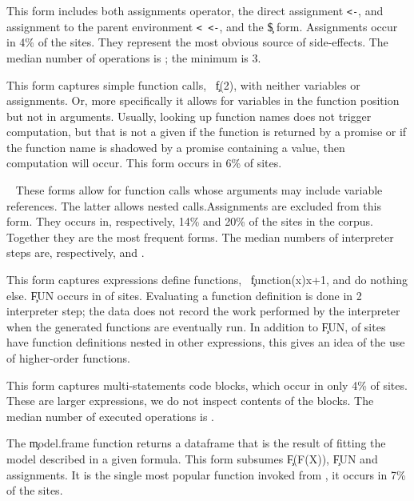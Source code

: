 \documentclass[screen,acmsmall]{acmart}
\begin{document}
\medskip\noindent{} This form includes both assignments
operator, the direct assignment {\tt <-}, and assignment to the parent
environment {\tt <\,\!<-}, and the \c{\$} form. Assignments occur in 4\% of the
sites. They represent the most obvious source of side-effects. The median number
of operations is \packageMinimizedmedianoperationsiRnd; the minimum is 3.

\medskip\noindent{} This form captures simple function calls,
\eg~\c{f(2)}, with neither variables or assignments. Or, more specifically it
allows for variables in the function position but not in arguments. Usually,
looking up function names does not trigger computation, but that is not a given
if the function is returned by a promise or if the function name is shadowed by
a promise containing a value, then computation will occur. This form occurs in
6\% of sites.

\medskip\noindent{}~ These
forms allow for function calls whose arguments may include variable references.
The latter allows nested calls.Assignments are excluded from this form. They
occurs in, respectively, 14\% and 20\% of the sites in the corpus. Together they
are the most frequent forms. The median numbers of interpreter steps are,
respectively, \packageMinimizedmedianoperationsdRnd and
\packageMinimizedmedianoperationsbRnd.

\medskip\noindent{} This form captures expressions define
functions, \eg~\c{function(x)x+1}, and do nothing else. \c{FUN} occurs in
\packageFunctionDefinitionSitesPercent of sites. Evaluating a function
definition is done in 2 interpreter step; the data does not record the work
performed by the interpreter when the generated functions are eventually run. In
addition to \c{FUN}, \packageGeneralizedFunctionDefinitionSitesPercent of sites
have function definitions nested in other expressions, this gives an idea of the
use of higher-order functions.

\medskip\noindent{} This form captures multi-statements
code blocks, which occur in only 4\% of sites. These are larger expressions, we
do not inspect contents of the blocks. The median number of executed operations
is \packageMinimizedmedianoperationsjRnd.

\medskip\noindent{} The \c{model.frame} function
returns a dataframe that is the result of fitting the model described in a given
formula. This form subsumes \c{F(F(X))}, \c{FUN} and assignments. It is the
single most popular function invoked from \eval, it occurs in 7\% of the sites.
\end{document}
